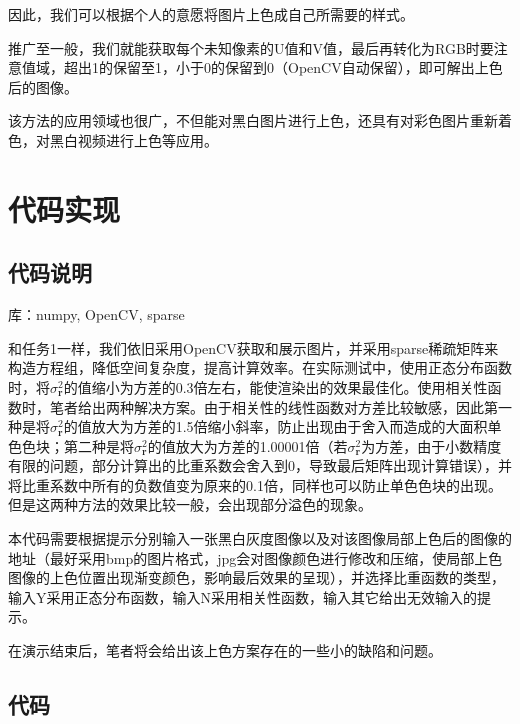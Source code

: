 \documentclass[12pt, a4paper, oneside]{report}
\begin{document}
	因此，我们可以根据个人的意愿将图片上色成自己所需要的样式。
	
	推广至一般，我们就能获取每个未知像素的U值和V值，最后再转化为RGB时要注意值域，超出1的保留至1，小于0的保留到0（OpenCV自动保留），即可解出上色后的图像。
	
	该方法的应用领域也很广，不但能对黑白图片进行上色，还具有对彩色图片重新着色，对黑白视频进行上色等应用。
	
	

	\section{代码实现}
	\subsection{代码说明}
	\noindent 库：numpy, OpenCV, sparse
	
	和任务1一样，我们依旧采用OpenCV获取和展示图片，并采用sparse稀疏矩阵来构造方程组，降低空间复杂度，提高计算效率。在实际测试中，使用正态分布函数时，将$\sigma_{\mathbf{r}}^2$的值缩小为方差的0.3倍左右，能使渲染出的效果最佳化。使用相关性函数时，笔者给出两种解决方案。由于相关性的线性函数对方差比较敏感，因此第一种是将$\sigma_{\mathbf{r}}^2$的值放大为方差的1.5倍缩小斜率，防止出现由于舍入而造成的大面积单色色块；第二种是将$\sigma_{\mathbf{r}}^2$的值放大为方差的1.00001倍（若$\sigma_{\mathbf{r}}^2$为方差，由于小数精度有限的问题，部分计算出的比重系数会舍入到0，导致最后矩阵出现计算错误），并将比重系数中所有的负数值变为原来的0.1倍，同样也可以防止单色色块的出现。但是这两种方法的效果比较一般，会出现部分溢色的现象。
	
	本代码需要根据提示分别输入一张黑白灰度图像以及对该图像局部上色后的图像的地址（最好采用bmp的图片格式，jpg会对图像颜色进行修改和压缩，使局部上色图像的上色位置出现渐变颜色，影响最后效果的呈现），并选择比重函数的类型，输入Y采用正态分布函数，输入N采用相关性函数，输入其它给出无效输入的提示。
	
	在演示结束后，笔者将会给出该上色方案存在的一些小的缺陷和问题。
	
	
	
	\subsection{代码}
	
\end{document}
